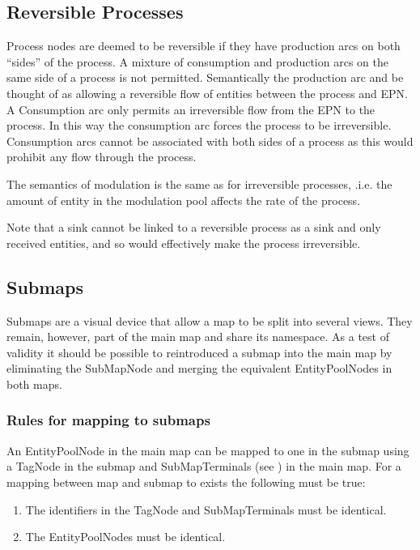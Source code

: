 \subsection{Reversible Processes}
\label{sec: semantics reversible procs}

Process nodes are deemed to be reversible if they have production arcs on both ``sides'' of the process. A mixture of consumption and production arcs on the same side of a process is not permitted. Semantically the production arc and be thought of as allowing a reversible flow of entities between the process and EPN. A Consumption arc only permits an irreversible flow from the EPN to the process. In this way the consumption arc forces the process to be irreversible. Consumption arcs cannot be associated with both sides of a process as this would prohibit any flow through the process.

The semantics of modulation is the same as for irreversible processes, .i.e. the amount of entity in the modulation pool affects the rate of the process.

Note that a sink cannot be linked to a reversible process as a sink and only received entities, and so would effectively make the process irreversible.

\subsection{Submaps}

Submaps are a visual device that allow a map to be split into several
views. They remain, however, part of the main map and share its
namespace. As a test of validity it should be possible to reintroduced
a submap into the main map by eliminating the SubMapNode and merging
the equivalent EntityPoolNodes in both maps.

\subsubsection{Rules for mapping to submaps}

An EntityPoolNode in the main map can be mapped to one in the submap
using a TagNode in the submap and SubMapTerminals (see ) in the main map. For a
mapping between map and submap to exists the following must be true:

\begin{enumerate}
\item The identifiers in the TagNode and SubMapTerminals must be identical.
\item The EntityPoolNodes must be identical.
\end{enumerate}

